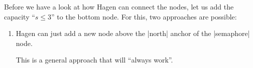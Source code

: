 Before we have a look at how Hagen can connect the nodes, let us add the
capacity ``$s \le 3$'' to the bottom node. For this, two approaches are
possible:
%
\begin{enumerate}
    \item Hagen can just add a new node above the |north| anchor of the
        |semaphore| node.
\begin{codeexample}[preamble={\usetikzlibrary{positioning}}]
\end{codeexample}
        This is a general approach that will ``always work''.


\end{enumerate}
